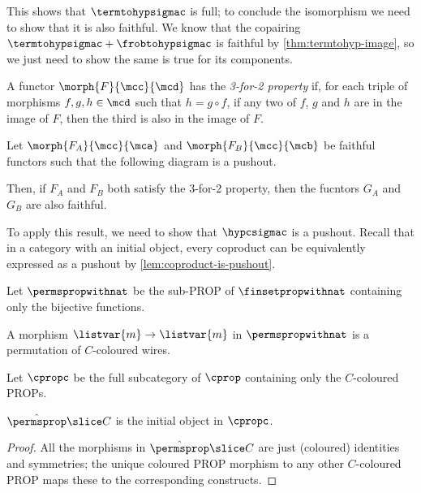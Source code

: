 This shows that \(\termtohypsigmac\) is full; to conclude the isomorphism we
need to show that it is also faithful.
We know that the copairing \(\termtohypsigmac + \frobtohypsigmac\) is faithful
by \cref{thm:termtohyp-image}, so we just need to show the same is true for its
components.


\begin{definition}
    A functor \(\morph{F}{\mcc}{\mcd}\) has the \emph{3-for-2 property} if,
    for each triple of morphisms \(f,g,h \in \mcd\) such that \(h = g \circ f\),
    if any two of \(f\), \(g\) and \(h\) are in the image of \(F\), then the
    third is also in the image of \(F\).
\end{definition}

\begin{theorem}
    Let \(\morph{F_A}{\mcc}{\mca}\) and \(\morph{F_B}{\mcc}{\mcb}\) be faithful
    functors such that the following diagram is a pushout.
    \begin{center}
        
    \end{center}
    Then, if \(F_A\) and \(F_B\) both satisfy the 3-for-2 property, then the
    fucntors \(G_A\) and \(G_B\) are also faithful.
\end{theorem}

To apply this result, we need to show that \(\hypcsigmac\) is a pushout.
Recall that in a category with an initial object, every coproduct can be
equivalently expressed as a pushout by \cref{lem:coproduct-is-pushout}.

\begin{definition}
    Let \(\permspropwithnat\) be the sub-PROP of \(\finsetpropwithnat\)
    containing only the bijective functions.
\end{definition}

A morphism \(\listvar{m} \to \listvar{m}\) in \(\permspropwithnat\) is a
permutation of \(C\)-coloured wires.

\begin{definition}
    Let \(\cpropc\) be the full subcategory of \(\cprop\) containing only the
    \(C\)-coloured PROPs.
\end{definition}

\begin{lemma}
    \label{cpropc-initial}
    \(\hat{\permsprop} \slice C\) is the initial object in \(\cpropc\).
\end{lemma}
\begin{proof}
    All the morphisms in \(\hat{\permsprop} \slice C\) are just (coloured)
    identities and symmetries; the unique coloured PROP morphism to any other
    \(C\)-coloured PROP maps these to the corresponding constructs.
\end{proof}

